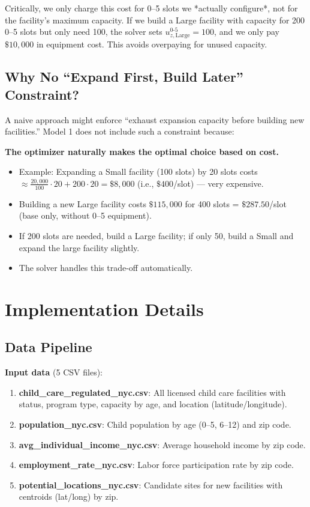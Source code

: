 \documentclass[12pt]{article}
\begin{document}
Critically, we only charge this cost for 0--5 slots we *actually configure*, not for the facility's maximum capacity. 
If we build a Large facility with capacity for 200 0--5 slots but only need 100, the solver sets $u_{z,\text{Large}}^{0\text{-}5} = 100$, 
and we only pay $\$10{,}000$ in equipment cost. This avoids overpaying for unused capacity.

\subsection{Why No ``Expand First, Build Later'' Constraint?}

A naive approach might enforce ``exhaust expansion capacity before building new facilities.'' Model 1 does not include 
such a constraint because:

\textbf{The optimizer naturally makes the optimal choice based on cost.}

\begin{itemize}
    \item Example: Expanding a Small facility (100 slots) by 20 slots costs $\approx \frac{20{,}000}{100} \cdot 20 + 200 \cdot 20 = \$8{,}000$ 
    (i.e., $\$400$/slot) — very expensive.
    \item Building a new Large facility costs $\$115{,}000$ for 400 slots = $\$287.50$/slot (base only, without 0--5 equipment).
    \item If 200 slots are needed, build a Large facility; if only 50, build a Small and expand the large facility slightly.
    \item The solver handles this trade-off automatically.
\end{itemize}

\section{Implementation Details}

\subsection{Data Pipeline}

\textbf{Input data} (5 CSV files):

\begin{enumerate}
    \item \textbf{child\_care\_regulated\_nyc.csv}: All licensed child care facilities with status, program type, capacity by age, and location (latitude/longitude).
    \item \textbf{population\_nyc.csv}: Child population by age (0--5, 6--12) and zip code.
    \item \textbf{avg\_individual\_income\_nyc.csv}: Average household income by zip code.
    \item \textbf{employment\_rate\_nyc.csv}: Labor force participation rate by zip code.
    \item \textbf{potential\_locations\_nyc.csv}: Candidate sites for new facilities with centroids (lat/long) by zip.
\end{enumerate}
\end{document}
